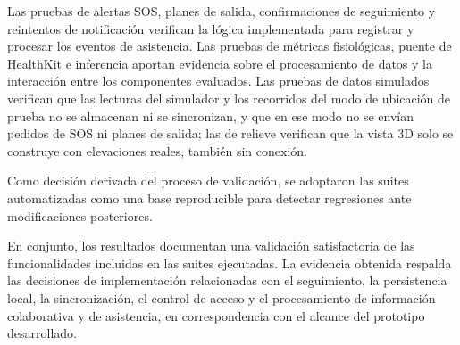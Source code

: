 Las pruebas de alertas SOS, planes de salida, confirmaciones de seguimiento y reintentos de notificación verifican la lógica implementada para registrar y procesar los eventos de asistencia. Las pruebas de métricas fisiológicas, puente de HealthKit e inferencia aportan evidencia sobre el procesamiento de datos y la interacción entre los componentes evaluados. Las pruebas de datos simulados verifican que las lecturas del simulador y los recorridos del modo de ubicación de prueba no se almacenan ni se sincronizan, y que en ese modo no se envían pedidos de SOS ni planes de salida; las de relieve verifican que la vista 3D solo se construye con elevaciones reales, también sin conexión.

Como decisión derivada del proceso de validación, se adoptaron las suites automatizadas como una base reproducible para detectar regresiones ante modificaciones posteriores.

En conjunto, los resultados documentan una validación satisfactoria de las funcionalidades incluidas en las suites ejecutadas. La evidencia obtenida respalda las decisiones de implementación relacionadas con el seguimiento, la persistencia local, la sincronización, el control de acceso y el procesamiento de información colaborativa y de asistencia, en correspondencia con el alcance del prototipo desarrollado.


